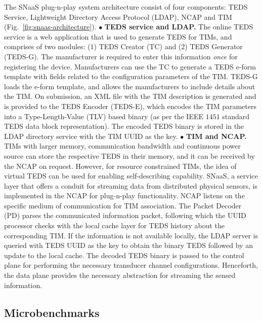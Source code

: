 \documentclass[conference]{IEEEtran}
\begin{document}
The SNaaS plug-n-play system architecture consist of four components: TEDS Service, Lightweight Directory Access Protocol (LDAP), NCAP and TIM (Fig.~\ref{fig:snaas-architecture}).
\vspace{1mm}
\newline
\noindent
$\bullet$ \textbf{TEDS service and LDAP.}
The online TEDS service is a web application that is used to generate TEDS for TIMs, and comprises of two modules: ($1$) TEDS Creator (TC) and ($2$) TEDS Generator (TEDS-G).
The manufacturer is required to enter this information \emph{once} for registering the device.
\newline
\indent
Manufacturers can use the TC to generate a TEDS e-form template with fields related to the configuration parameters of the TIM. TEDS-G loads the e-form template, and allows the manufacturers to include details about the TIM.
On submission, an XML file with the TIM description is generated and is provided to the TEDS Encoder (TEDS-E), which encodes the TIM parameters into a Type-Length-Value (TLV) based binary (as per the IEEE $1451$ standard TEDS data block representation).
The encoded TEDS binary is stored in the LDAP directory service with the TIM UUID as the key.
\vspace{1mm}
\newline
\noindent
$\bullet$ \textbf{TIM and NCAP.}
TIMs with larger memory, communication bandwidth and continuous power source can store the respective TEDS in their memory, and it can be received by the NCAP on request. 
However, for resource constrained TIMs, the idea of virtual TEDS can be used for enabling self-describing capability. 
\newline
\indent
SNaaS, a service layer that offers a conduit for streaming data from distributed physical sensors, is implemented in the NCAP for plug-n-play functionality.  
NCAP listens on the specific medium of communication for TIM association.
The Packet Decoder (PD) parses the communicated information packet, following which the UUID processor checks with the local cache layer for TEDS history about the corresponding TIM.
If the information is not available locally, the LDAP server is queried with TEDS UUID as the key to obtain the binary TEDS followed by an update to the local cache. 
The decoded TEDS binary is passed to the control plane for performing the necessary transducer channel configurations.
Henceforth, the data plane provides the necessary abstraction for streaming the sensed information. 

\subsection{Microbenchmarks}
\end{document}

